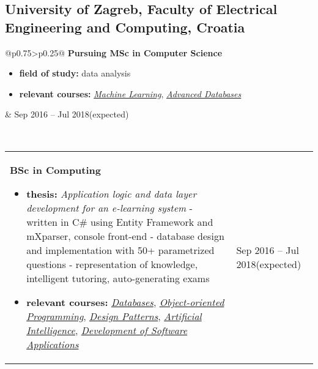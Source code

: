 \documentclass[a4paper]{article}
\makeatletter
\newlength{\tablewidth}
\newenvironment{period}[2]{%
\newcommand{\sarma}{#2}%
\setlength{\tablewidth}{\linewidth}
\addtolength{\tablewidth}{-2\tabcolsep}
\begin{tabular}{@{}p{0.75\tablewidth}>{\raggedleft\arraybackslash}p{0.25\tablewidth}@{}}%
#1 \newline
\begin{itemize}
}{%
\end{itemize} & \sarma \\%
\end{tabular}\\
}
\makeatother
\begin{document}
\subsection{University of Zagreb, Faculty of Electrical Engineering and Computing, Croatia}
\begin{period}{\textbf{Pursuing MSc in Computer Science}}{Sep 2016 -- Jul 2018\linebreak(expected)}
    \item \textbf{field of study:}
        data analysis
    \item \textbf{relevant courses:}
	    \textit{\href{%
	    	}{Machine Learning}},
	    \textit{\href{%
	    	}{Advanced Databases}}
\end{period}
\begin{period}{\textbf{BSc in Computing}}{Sep 2013 -- Jul 2016}
    \item \textbf{thesis:}
        \textit{Application logic and data layer development for an e-learning system}
        \newline - written in C\# using Entity Framework and mXparser, console front-end 
        \newline - database design and implementation with 50+ parametrized questions
        \newline - representation of knowledge, intelligent tutoring, auto-generating exams
        
    \item \textbf{relevant courses:}
	    \textit{\href{%
	    		}{Databases}},
		\textit{\href{%
				}{Object-oriented Programming}},
		\textit{\href{%
			}{Design Patterns}},
		\textit{\href{%
				}{Artificial Intelligence}},
		\textit{\href{%
				}{Development of Software Applications}}
		
\end{period}
\end{document}
